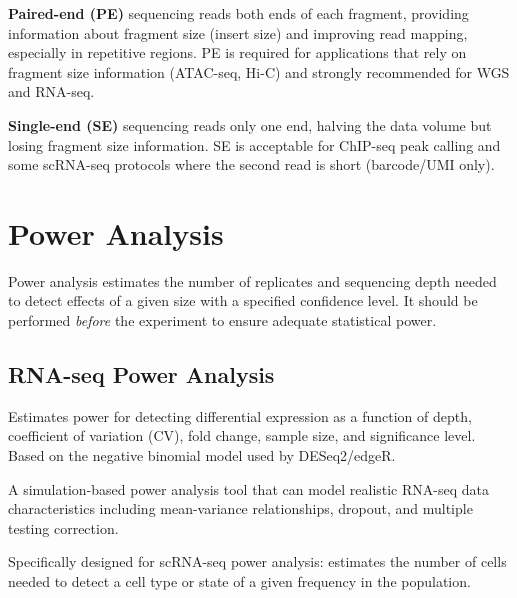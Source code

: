 \begin{keyconcept}[title={Paired-End vs Single-End}]
\textbf{Paired-end (PE)} sequencing reads both ends of each fragment, providing information about fragment size (insert size) and improving read mapping, especially in repetitive regions. PE is required for applications that rely on fragment size information (ATAC-seq, Hi-C) and strongly recommended for WGS and RNA-seq.

\textbf{Single-end (SE)} sequencing reads only one end, halving the data volume but losing fragment size information. SE is acceptable for ChIP-seq peak calling and some scRNA-seq protocols where the second read is short (barcode/UMI only).
\end{keyconcept}

\section{Power Analysis}
\label{sec:expdesign:power}

Power analysis estimates the number of replicates and sequencing depth needed to detect effects of a given size with a specified confidence level. It should be performed \textit{before} the experiment to ensure adequate statistical power.

\subsection{RNA-seq Power Analysis}

\begin{description}[style=nextline, font=\bfseries, itemsep=3pt]
  \item[RNASeqPower (Bioconductor)]
  Estimates power for detecting differential expression as a function of depth, coefficient of variation (CV), fold change, sample size, and significance level. Based on the negative binomial model used by DESeq2/edgeR.

  \item[powsimR]
  A simulation-based power analysis tool that can model realistic RNA-seq data characteristics including mean-variance relationships, dropout, and multiple testing correction.

  \item[how\_many\_cells]
  Specifically designed for scRNA-seq power analysis: estimates the number of cells needed to detect a cell type or state of a given frequency in the population.
\end{description}

